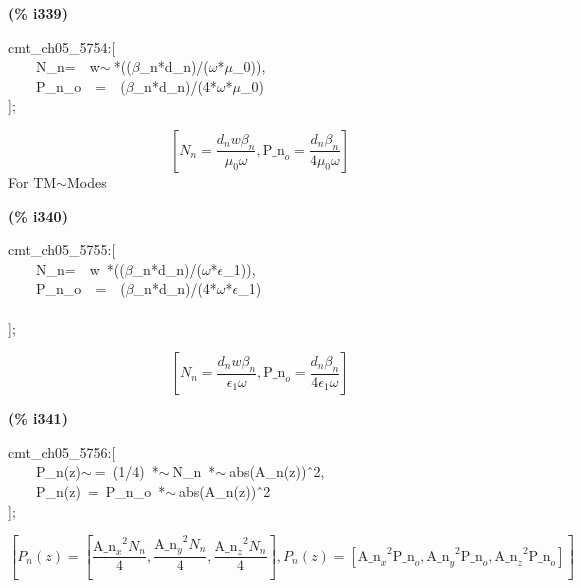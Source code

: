 \documentclass[fleqn]{article}
\begin{document}
\noindent
\begin{minipage}[t]{4.000000em}\color{red}\bfseries
(\% i339)	
\end{minipage}
\begin{minipage}[t]{\textwidth}\color{blue}
cmt\_ch05\_5754:[\\
\ \ \ \ N\_n=\ \ w\ensuremath{\sim\ }*((\ensuremath{\beta}\_n*d\_n)/(\ensuremath{\omega}*\ensuremath{\mu}\_0)),\\
\ \ \ \ P\_n\_o\ \ =\ \ (\ensuremath{\beta}\_n*d\_n)/(4*\ensuremath{\omega}*\ensuremath{\mu}\_0)\\
];
\end{minipage}
\[\displaystyle \tag{\% o339} 
\left[ {N_n}=\frac{{d_n} w {{\beta }_n}}{{{\mu }_0} \omega }\operatorname{,}{{\ensuremath{\mathrm{P\_ n}}}_o}=\frac{{d_n} {{\beta }_n}}{4 {{\mu }_0} \omega }\right] \mbox{}
\]
For TM\ensuremath{\sim }Modes


\noindent
\begin{minipage}[t]{4.000000em}\color{red}\bfseries
(\% i340)	
\end{minipage}
\begin{minipage}[t]{\textwidth}\color{blue}
cmt\_ch05\_5755:[\\
\ \ \ \ N\_n=\ \ w\ *((\ensuremath{\beta}\_n*d\_n)/(\ensuremath{\omega}*\ensuremath{\epsilon}\_1)),\\
\ \ \ \ P\_n\_o\ \ =\ \ (\ensuremath{\beta}\_n*d\_n)/(4*\ensuremath{\omega}*\ensuremath{\epsilon}\_1)\\
\\
];
\end{minipage}
\[\displaystyle \tag{\% o340} 
\left[ {N_n}=\frac{{d_n} w {{\beta }_n}}{{{\epsilon }_1} \omega }\operatorname{,}{{\ensuremath{\mathrm{P\_ n}}}_o}=\frac{{d_n} {{\beta }_n}}{4 {{\epsilon }_1} \omega }\right] \mbox{}
\]


\noindent
\begin{minipage}[t]{4.000000em}\color{red}\bfseries
(\% i341)	
\end{minipage}
\begin{minipage}[t]{\textwidth}\color{blue}
cmt\_ch05\_5756:[\\
\ \ \ \ P\_n(z)\ensuremath{\sim\ }=\ (1/4)\ *\ensuremath{\sim\ }N\_n\ *\ensuremath{\sim\ }abs(A\_n(z))\^\ 2,\\
\ \ \ \ P\_n(z)\ =\ P\_n\_o\ *\ensuremath{\sim\ }abs(A\_n(z))\^\ 2\\
];
\end{minipage}
\[\displaystyle \tag{\% o341} 
\operatorname{[}{P_n}(z)=\left[ \frac{{{{{\ensuremath{\mathrm{A\_ n}}}_x}}^{2}} {N_n}}{4}\operatorname{,}\frac{{{{{\ensuremath{\mathrm{A\_ n}}}_y}}^{2}} {N_n}}{4}\operatorname{,}\frac{{{{{\ensuremath{\mathrm{A\_ n}}}_z}}^{2}} {N_n}}{4}\right] \operatorname{,}{P_n}(z)=\left[ {{{{\ensuremath{\mathrm{A\_ n}}}_x}}^{2}} {{\ensuremath{\mathrm{P\_ n}}}_o}\operatorname{,}{{{{\ensuremath{\mathrm{A\_ n}}}_y}}^{2}} {{\ensuremath{\mathrm{P\_ n}}}_o}\operatorname{,}{{{{\ensuremath{\mathrm{A\_ n}}}_z}}^{2}} {{\ensuremath{\mathrm{P\_ n}}}_o}\right] \operatorname{]}\mbox{}
\]
\end{document}
